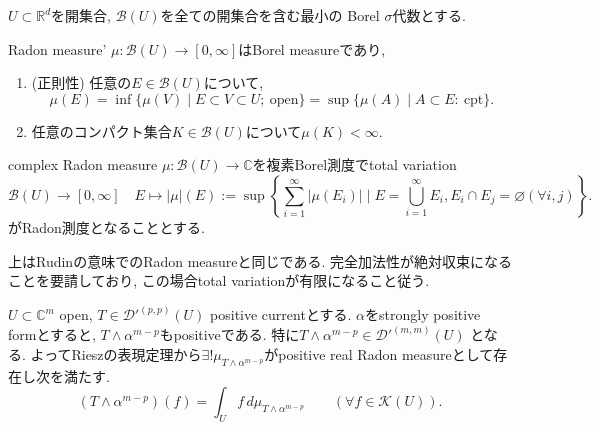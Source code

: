 \begin{tcolorbox}[mybox]
\begin{defn}
$U\subset\mathbb{R}^d$を開集合, 
$\mathcal{B}(U)$を全ての開集合を含む最小の Borel $\sigma$代数とする. 

Radon measure' $\mu\colon\mathcal{B}(U)\to[0,\infty]$はBorel measureであり, 
\begin{enumerate}
\item (正則性) 任意の$ E\in\mathcal{B}(U)$について, 
\begin{equation*}
\mu(E)
=
\inf\{\mu(V)\mid E\subset V\subset U;\ \text{open}\}
=
\sup\{\mu(A)\mid A\subset E:\ \text{cpt}\}.
\end{equation*}
\item 任意のコンパクト集合$K\in\mathcal{B}(U)$について$\mu(K)<\infty$.
\end{enumerate}

complex Radon measure $\mu\colon\mathcal{B}(U)\to\mathbb{C}$を複素Borel測度でtotal variation
\begin{equation*}
\mathcal{B}(U)\longrightarrow[0,\infty] \quad E \longmapsto
|\mu|(E)
:=
\sup\left\{
\sum_{i=1}^{\infty}|\mu(E_i)| \mid E=\bigcup_{i=1}^{\infty}E_i, E_i\cap E_j=\varnothing (\forall i,j)
\right\}.
\end{equation*}
がRadon測度となることとする.
\end{defn}
\end{tcolorbox}
上はRudinの意味でのRadon measureと同じである. 
完全加法性が絶対収束になることを要請しており, この場合total variationが有限になること従う. 



\begin{rem}
\label{rem-H-5.8}
$U\subset\mathbb{C}^m$ open,  $T\in\mathcal{D}'^{(p,p)}(U)$ positive currentとする. 
$\alpha$をstrongly positive formとすると, $T\wedge\alpha^{m-p}$もpositiveである. 特に$T\wedge\alpha^{m-p}\in\mathcal{D}'^{(m,m)}(U)$ となる. 
よってRieszの表現定理から$\exists!\mu_{T\wedge\alpha^{m-p}}$がpositive real Radon measureとして存在し次を満たす. 
\begin{equation*}
(T\wedge\alpha^{m-p})(f)
=
\int_U f\,d\mu_{T\wedge\alpha^{m-p}}
\qquad
(\forall f\in\mathcal{K}(U)).
\end{equation*}
\end{rem}

